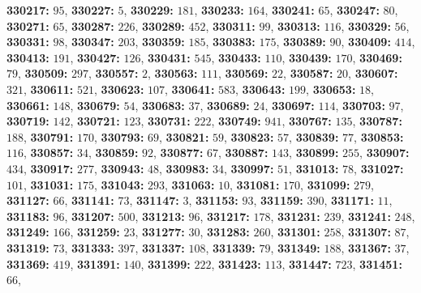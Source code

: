 \textsf{\bfseries 330217:} $95$, \textsf{\bfseries 330227:} $5$, \textsf{\bfseries 330229:} $181$, \textsf{\bfseries 330233:} $164$, \textsf{\bfseries 330241:} $65$, \textsf{\bfseries 330247:} $80$, \textsf{\bfseries 330271:} $65$, \textsf{\bfseries 330287:} $226$, \textsf{\bfseries 330289:} $452$, \textsf{\bfseries 330311:} $99$, \textsf{\bfseries 330313:} $116$, \textsf{\bfseries 330329:} $56$, \textsf{\bfseries 330331:} $98$, \textsf{\bfseries 330347:} $203$, \textsf{\bfseries 330359:} $185$, \textsf{\bfseries 330383:} $175$, \textsf{\bfseries 330389:} $90$, \textsf{\bfseries 330409:} $414$, \textsf{\bfseries 330413:} $191$, \textsf{\bfseries 330427:} $126$, \textsf{\bfseries 330431:} $545$, \textsf{\bfseries 330433:} $110$, \textsf{\bfseries 330439:} $170$, \textsf{\bfseries 330469:} $79$, \textsf{\bfseries 330509:} $297$, \textsf{\bfseries 330557:} $2$, \textsf{\bfseries 330563:} $111$, \textsf{\bfseries 330569:} $22$, \textsf{\bfseries 330587:} $20$, \textsf{\bfseries 330607:} $321$, \textsf{\bfseries 330611:} $521$, \textsf{\bfseries 330623:} $107$, \textsf{\bfseries 330641:} $583$, \textsf{\bfseries 330643:} $199$, \textsf{\bfseries 330653:} $18$, \textsf{\bfseries 330661:} $148$, \textsf{\bfseries 330679:} $54$, \textsf{\bfseries 330683:} $37$, \textsf{\bfseries 330689:} $24$, \textsf{\bfseries 330697:} $114$, \textsf{\bfseries 330703:} $97$, \textsf{\bfseries 330719:} $142$, \textsf{\bfseries 330721:} $123$, \textsf{\bfseries 330731:} $222$, \textsf{\bfseries 330749:} $941$, \textsf{\bfseries 330767:} $135$, \textsf{\bfseries 330787:} $188$, \textsf{\bfseries 330791:} $170$, \textsf{\bfseries 330793:} $69$, \textsf{\bfseries 330821:} $59$, \textsf{\bfseries 330823:} $57$, \textsf{\bfseries 330839:} $77$, \textsf{\bfseries 330853:} $116$, \textsf{\bfseries 330857:} $34$, \textsf{\bfseries 330859:} $92$, \textsf{\bfseries 330877:} $67$, \textsf{\bfseries 330887:} $143$, \textsf{\bfseries 330899:} $255$, \textsf{\bfseries 330907:} $434$, \textsf{\bfseries 330917:} $277$, \textsf{\bfseries 330943:} $48$, \textsf{\bfseries 330983:} $34$, \textsf{\bfseries 330997:} $51$, \textsf{\bfseries 331013:} $78$, \textsf{\bfseries 331027:} $101$, \textsf{\bfseries 331031:} $175$, \textsf{\bfseries 331043:} $293$, \textsf{\bfseries 331063:} $10$, \textsf{\bfseries 331081:} $170$, \textsf{\bfseries 331099:} $279$, \textsf{\bfseries 331127:} $66$, \textsf{\bfseries 331141:} $73$, \textsf{\bfseries 331147:} $3$, \textsf{\bfseries 331153:} $93$, \textsf{\bfseries 331159:} $390$, \textsf{\bfseries 331171:} $11$, \textsf{\bfseries 331183:} $96$, \textsf{\bfseries 331207:} $500$, \textsf{\bfseries 331213:} $96$, \textsf{\bfseries 331217:} $178$, \textsf{\bfseries 331231:} $239$, \textsf{\bfseries 331241:} $248$, \textsf{\bfseries 331249:} $166$, \textsf{\bfseries 331259:} $23$, \textsf{\bfseries 331277:} $30$, \textsf{\bfseries 331283:} $260$, \textsf{\bfseries 331301:} $258$, \textsf{\bfseries 331307:} $87$, \textsf{\bfseries 331319:} $73$, \textsf{\bfseries 331333:} $397$, \textsf{\bfseries 331337:} $108$, \textsf{\bfseries 331339:} $79$, \textsf{\bfseries 331349:} $188$, \textsf{\bfseries 331367:} $37$, \textsf{\bfseries 331369:} $419$, \textsf{\bfseries 331391:} $140$, \textsf{\bfseries 331399:} $222$, \textsf{\bfseries 331423:} $113$, \textsf{\bfseries 331447:} $723$, \textsf{\bfseries 331451:} $66$, 
